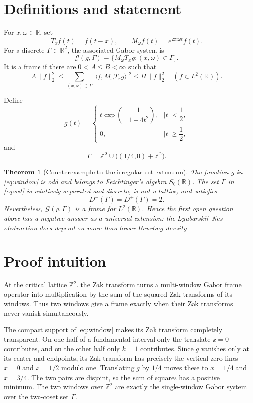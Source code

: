 \documentclass[11pt]{article}
\newtheorem{theorem}{Theorem}
\newcommand{\R}{\mathbb R}
\newcommand{\Z}{\mathbb Z}
\newcommand{\cG}{\mathcal G}
\newcommand{\T}{T}
\newcommand{\M}{M}
\newcommand{\Dminus}{D^-}
\newcommand{\Dplus}{D^+}
\begin{document}
\section{Definitions and statement}

For $x,\omega\in\R$, set
\[
  \T_xf(t)=f(t-x),\qquad
  \M_\omega f(t)=e^{2\pi i\omega t}f(t).
\]
For a discrete $\Gamma\subset\R^2$, the associated Gabor system is
\[
 \cG(g,\Gamma)=\{\M_\omega\T_xg:(x,\omega)\in\Gamma\}.
\]
It is a frame if there are $0<A\leq B<\infty$ such that
\[
 A\|f\|_2^2\leq
 \sum_{(x,\omega)\in\Gamma}|\langle f,\M_\omega\T_xg\rangle|^2
 \leq B\|f\|_2^2
 \quad(f\in L^2(\R)).
\]

Define
\begin{equation}\label{eq:window}
 g(t)=
 \begin{cases}
 t\exp\!\left(-\dfrac{1}{1-4t^2}\right),& |t|<\dfrac12,\\[6pt]
 0,& |t|\geq\dfrac12,
 \end{cases}
\end{equation}
and
\begin{equation}\label{eq:set}
 \Gamma=\Z^2\cup\bigl((1/4,0)+\Z^2\bigr).
\end{equation}

\begin{theorem}[Counterexample to the irregular-set extension]
\label{thm:main}
The function $g$ in \eqref{eq:window} is odd and belongs to Feichtinger's
algebra $S_0(\R)$.  The set $\Gamma$ in \eqref{eq:set} is relatively
separated and discrete, is not a lattice, and satisfies
\[
 \Dminus(\Gamma)=\Dplus(\Gamma)=2.
\]
Nevertheless, $\cG(g,\Gamma)$ is a frame for $L^2(\R)$.  Hence the first
open question above has a negative answer as a universal extension: the
Lyubarskii--Nes obstruction does depend on more than lower Beurling density.
\end{theorem}

\section{Proof intuition}

At the critical lattice $\Z^2$, the Zak transform turns a multi-window
Gabor frame operator into multiplication by the sum of the squared Zak
transforms of its windows.  Thus two windows give a frame exactly when their
Zak transforms never vanish simultaneously.

The compact support of \eqref{eq:window} makes its Zak transform completely
transparent.  On one half of a fundamental interval only the translate
$k=0$ contributes, and on the other half only $k=1$ contributes.  Since $g$
vanishes only at its center and endpoints, its Zak transform has precisely
the vertical zero lines $x=0$ and $x=1/2$ modulo one.  Translating $g$ by
$1/4$ moves these to $x=1/4$ and $x=3/4$.  The two pairs are disjoint, so
the sum of squares has a positive minimum.  The two windows over $\Z^2$
are exactly the single-window Gabor system over the two-coset set $\Gamma$.
\end{document}
